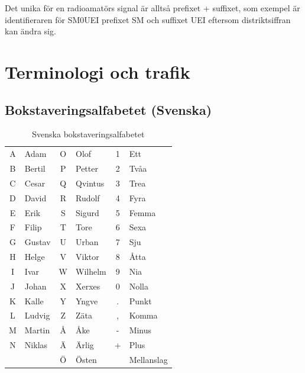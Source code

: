 Det unika för en radioamatörs signal är alltså prefixet + suffixet,
som exempel är identifieraren för SM0UEI prefixet SM och suffixet UEI
eftersom distriktsiffran kan ändra sig. 

\section{Terminologi och trafik}

\subsection{Bokstaveringsalfabetet (Svenska)}

\begin{table}[H]
	\centering
\begin{longtable}{cl|cl|cl }
	A & Adam   & O & Olof    & 1 & Ett        \\
	B & Bertil & P & Petter  & 2 & Tvåa       \\
	C & Cesar  & Q & Qvintus & 3 & Trea       \\
	D & David  & R & Rudolf  & 4 & Fyra       \\
	E & Erik   & S & Sigurd  & 5 & Femma      \\
	F & Filip  & T & Tore    & 6 & Sexa       \\
	G & Gustav & U & Urban   & 7 & Sju        \\
	H & Helge  & V & Viktor  & 8 & Åtta       \\
	I & Ivar   & W & Wilhelm & 9 & Nia        \\
	J & Johan  & X & Xerxes  & 0 & Nolla      \\
	K & Kalle  & Y & Yngve   & . & Punkt      \\
	L & Ludvig & Z & Zäta    & , & Komma      \\
	M & Martin & Å & Åke     & - & Minus      \\
	N & Niklas & Ä & Ärlig   & + & Plus       \\
	  &        & Ö & Östen   &   & Mellanslag \\
\end{longtable}
\caption{Svenska bokstaveringsalfabetet}
\end{table}

